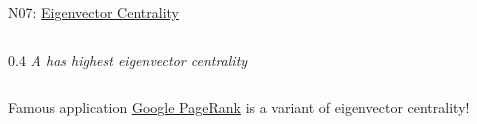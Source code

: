 \documentclass[aspectratio=169, 10pt]{beamer}
\begin{document}
\begin{frame}{N07: \href{https://en.wikipedia.org/wiki/Eigenvector_centrality}{Eigenvector Centrality}}
\begin{columns}
\begin{column}{0.4\textwidth}
            \textit{A has highest eigenvector centrality}
        \end{column}
    \end{columns}
    
    \vspace{1mm}
    
    \begin{block}{\footnotesize Famous application}
        \footnotesize \href{https://en.wikipedia.org/wiki/PageRank}{Google PageRank} is a variant of eigenvector centrality!
    \end{block}
    
\end{frame}

\end{document}

